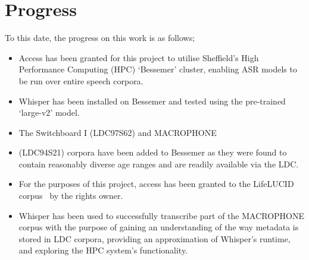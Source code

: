 \chapter{Progress}\label{ch:progress}

To this date, the progress on this work is as follows;

\begin{itemize}
    \item Access has been granted for this project to utilise Sheffield's High Performance
    Computing (HPC) `Bessemer' cluster, enabling ASR models to be run over entire speech corpora.
    \item Whisper\cite{whisper} has been installed on Bessemer and tested using the pre-trained
    `large-v2' model.
    \item The Switchboard I (LDC97S62)\cite{switchboard-ldc} and MACROPHONE
    \item (LDC94S21)\cite{macrophone} corpora have been added to Bessemer as they were found to
    contain reasonably diverse age ranges and are readily available via the LDC\@.
    \item For the purposes of this project, access has been granted to the LifeLUCID
    corpus~\cite{lifelucid} by the rights owner.
    \item Whisper has been used to successfully transcribe part of the MACROPHONE corpus with the
    purpose of gaining an understanding of the way metadata is stored in LDC corpora, providing an
    approximation of Whisper's runtime, and exploring the HPC system's functionality.
\end{itemize}

